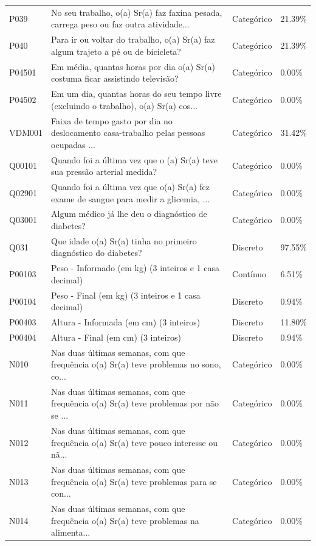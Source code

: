 \documentclass[12pt, a4paper]{article}
\begin{document}
\begin{longtable}{p{2.5cm} p{7.5cm} p{2.5cm} p{2.5cm}}
P039 & No seu trabalho, o(a) Sr(a) faz faxina pesada, carrega peso ou faz outra atividade... & Categórico & 21.39\% \\
P040 & Para ir ou voltar do trabalho, o(a) Sr(a) faz algum trajeto a pé ou de bicicleta? & Categórico & 21.39\% \\
P04501 & Em média, quantas horas por dia o(a) Sr(a) costuma ficar assistindo televisão? & Categórico & 0.00\% \\
P04502 & Em um dia, quantas horas do seu tempo livre (excluindo o trabalho), o(a) Sr(a) cos... & Categórico & 0.00\% \\
VDM001 & Faixa de tempo gasto por dia no deslocamento casa-trabalho pelas pessoas ocupadas ... & Categórico & 31.42\% \\
Q00101 & Quando foi a última vez que o (a) Sr(a) teve sua pressão arterial medida? & Categórico & 0.00\% \\
Q02901 & Quando foi a última vez que o(a) Sr(a) fez exame de sangue para medir a glicemia, ... & Categórico & 0.00\% \\
Q03001 & Algum médico já lhe deu o diagnóstico de diabetes? & Categórico & 0.00\% \\
Q031 & Que idade o(a) Sr(a) tinha no primeiro diagnóstico do diabetes? & Discreto & 97.55\% \\
P00103 & Peso - Informado (em kg) (3 inteiros e 1 casa decimal) & Contínuo & 6.51\% \\
P00104 & Peso - Final (em kg) (3 inteiros e 1 casa decimal) & Discreto & 0.94\% \\
P00403 & Altura - Informada (em cm) (3 inteiros) & Discreto & 11.80\% \\
P00404 & Altura - Final (em cm) (3 inteiros) & Discreto & 0.94\% \\
N010 & Nas duas últimas semanas, com que frequência o(a) Sr(a) teve problemas no sono, co... & Categórico & 0.00\% \\
N011 & Nas duas últimas semanas, com que frequência o(a) Sr(a) teve problemas por não se ... & Categórico & 0.00\% \\
N012 & Nas duas últimas semanas, com que frequência o(a) Sr(a) teve pouco interesse ou nã... & Categórico & 0.00\% \\
N013 & Nas duas últimas semanas, com que frequência o(a) Sr(a) teve problemas para se con... & Categórico & 0.00\% \\
N014 & Nas duas últimas semanas, com que frequência o(a) Sr(a) teve problemas na alimenta... & Categórico & 0.00\% \\

\end{longtable}
\end{document}

